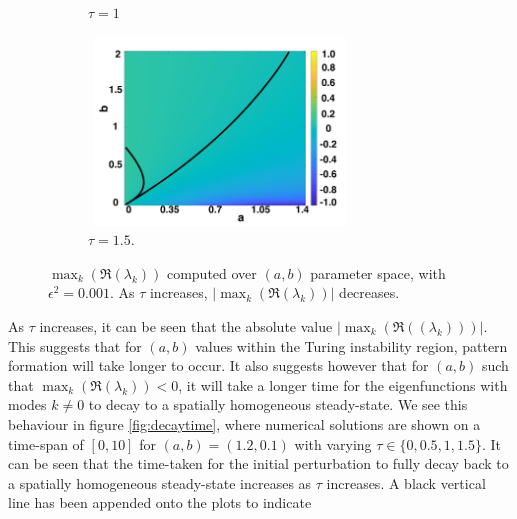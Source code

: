 \documentclass[12pt]{report}
\begin{document}
\begin{figure}[H]
\begin{subfigure}[b]{0.45\textwidth}
        \caption{$\tau=1$}
        \label{}
    \end{subfigure}
    \hfill
    \begin{subfigure}[b]{0.45\textwidth}
        \centering
        \includegraphics[width=7cm,height=5cm]{tau15bif.png}
        \caption{$\tau=1.5$.}
        \label{}
    \end{subfigure}
    \caption{$\max_k(\Re(\lambda_k))$ computed over $(a,b)$ parameter space, with $\epsilon^2=0.001$. As $\tau$ increases, $|\max_k(\Re(\lambda_k))|$ decreases.}
    \label{fig:lambdavary}
\end{figure}
As $\tau$ increases, it can be seen that the absolute value $|\max_k(\Re((\lambda_k)))|$. This suggests that for $(a,b)$ values within the Turing instability region, pattern formation will take longer to occur. It also suggests however that for $(a,b)$ such that $\max_k(\Re(\lambda_k))<0$, it will take a longer time for the eigenfunctions with modes $k\neq0$ to decay to a spatially homogeneous steady-state. We see this behaviour in figure \ref{fig:decaytime}, where numerical solutions are shown on a time-span of $[0,10]$ for $(a,b)=(1.2,0.1)$ with varying $\tau\in\{0,0.5,1,1.5\}$. It can be seen that the time-taken for the initial perturbation to fully decay back to a spatially homogeneous steady-state increases as $\tau$ increases. A black vertical line has been appended onto the plots to indicate
\end{document}
